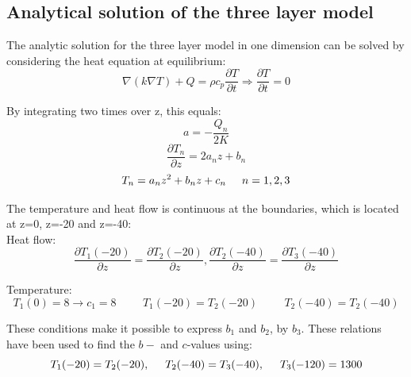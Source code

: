\documentclass[10pt,a4paper]{article}
\begin{document}
\subsection*{Analytical solution of the three layer model}

\noindent The analytic solution for the three layer model in one dimension can be solved by considering the heat equation at equilibrium:\\

\begin{equation}
\nabla(k\nabla T) +Q=\rho c_p \frac{\partial T}{\partial t} \Rightarrow \frac{\partial T}{\partial t}=0
\end{equation}

\noindent By integrating two times over z, this equals:
\begin{equation}
a=-\frac{Q_n}{2K}
\end{equation}
\begin{equation}
\frac{\partial T_n}{\partial z}=2a_nz+b_n
\end{equation}
\begin{equation}
T_n=a_nz^2+b_nz+c_n \hspace{0.5cm} n= 1,2,3
\end{equation}

\noindent The temperature and heat flow is continuous at the boundaries, which is located at z=0, z=-20 and z=-40:\\

\noindent Heat flow:
\begin{equation}
\frac{ \partial T_1(-20)}{\partial z}=\frac{\partial T_2(-20)}{\partial z},
\frac{\partial T_2(-40)}{\partial z}=\frac{\partial T_3(-40)}{\partial z}
\end{equation}

\noindent Temperature:
\begin{equation}
T_1(0)=8 \rightarrow c_1=8 \hspace{1cm}
T_1(-20)=T_2(-20) \hspace{1cm}
T_2(-40)=T_2(-40)
\end{equation}




\noindent These conditions make it possible to express $b_1$ and $b_2$, by $b_3$.
\noindent These relations have been used to find the $b-$ and $c$-values using:
\begin{equation}
T_1(-20)=T_2(-20),\hspace{0.5cm} T_2(-40)=T_3(-40), \hspace{0.5cm}T_3(-120)=1300
\end{equation}
\end{document}

